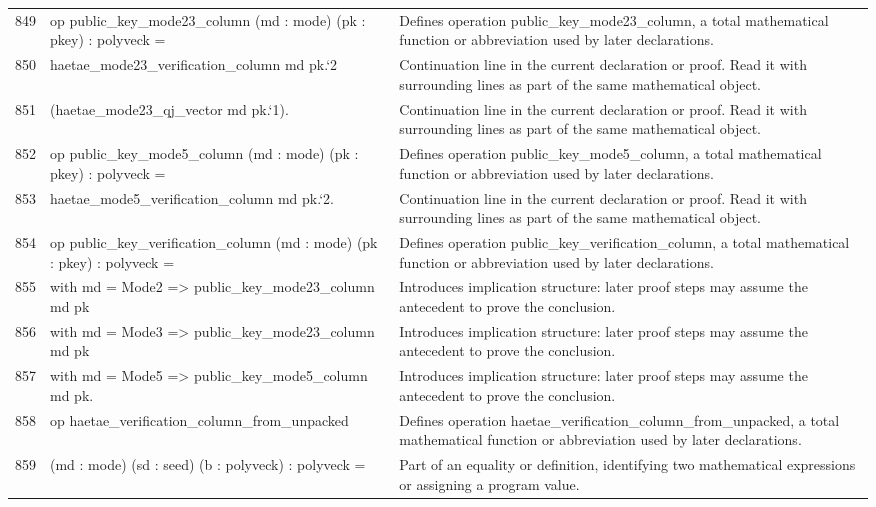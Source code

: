 \documentclass[10pt]{article}
\begin{document}
\begin{longtable}{r L{0.53\textwidth} L{0.37\textwidth}}
849 & {\ttfamily\scriptsize op public\_key\_mode23\_column (md : mode) (pk : pkey) : polyveck =} & Defines operation public\_key\_mode23\_column, a total mathematical function or abbreviation used by later declarations. \\
850 & {\ttfamily\scriptsize   haetae\_mode23\_verification\_column md pk.`2} & Continuation line in the current declaration or proof.  Read it with surrounding lines as part of the same mathematical object. \\
851 & {\ttfamily\scriptsize     (haetae\_mode23\_qj\_vector md pk.`1).} & Continuation line in the current declaration or proof.  Read it with surrounding lines as part of the same mathematical object. \\
852 & {\ttfamily\scriptsize op public\_key\_mode5\_column (md : mode) (pk : pkey) : polyveck =} & Defines operation public\_key\_mode5\_column, a total mathematical function or abbreviation used by later declarations. \\
853 & {\ttfamily\scriptsize   haetae\_mode5\_verification\_column md pk.`2.} & Continuation line in the current declaration or proof.  Read it with surrounding lines as part of the same mathematical object. \\
854 & {\ttfamily\scriptsize op public\_key\_verification\_column (md : mode) (pk : pkey) : polyveck =} & Defines operation public\_key\_verification\_column, a total mathematical function or abbreviation used by later declarations. \\
855 & {\ttfamily\scriptsize   with md = Mode2 => public\_key\_mode23\_column md pk} & Introduces implication structure: later proof steps may assume the antecedent to prove the conclusion. \\
856 & {\ttfamily\scriptsize   with md = Mode3 => public\_key\_mode23\_column md pk} & Introduces implication structure: later proof steps may assume the antecedent to prove the conclusion. \\
857 & {\ttfamily\scriptsize   with md = Mode5 => public\_key\_mode5\_column md pk.} & Introduces implication structure: later proof steps may assume the antecedent to prove the conclusion. \\
858 & {\ttfamily\scriptsize op haetae\_verification\_column\_from\_unpacked} & Defines operation haetae\_verification\_column\_from\_unpacked, a total mathematical function or abbreviation used by later declarations. \\
859 & {\ttfamily\scriptsize    (md : mode) (sd : seed) (b : polyveck) : polyveck =} & Part of an equality or definition, identifying two mathematical expressions or assigning a program value. \\

\end{longtable}
\end{document}
